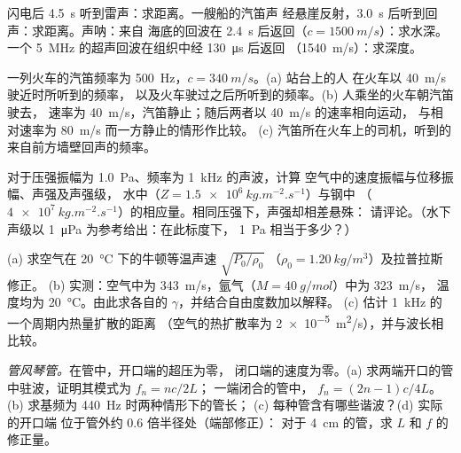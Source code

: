 \begin{exercise}[$\star$]\label{exo:b2:sound-waves:4}
闪电后 \qty{4.5}{s} 听到雷声：求距离。一艘船的汽笛声
经悬崖反射，\qty{3.0}{s} 后听到回声：求距离。声呐：来自
海底的回波在 \qty{2.4}{s} 后返回（$c = \qty{1500}{m/s}$）：求水深。一个
\qty{5}{MHz} 的超声回波在组织中经 \qty{130}{\micro s} 后返回
（\qty{1540}{m/s}）：求深度。
\end{exercise}

\begin{exercise}[$\star\star$]\label{exo:b2:sound-waves:5}
一列火车的汽笛频率为 \qty{500}{Hz}，$c = \qty{340}{m/s}$。(a) 站台上的人
在火车以 \qty{40}{m/s} 驶近时所听到的频率，
以及火车驶过之后所听到的频率。(b) 人乘坐的火车朝汽笛驶去，
速率为 \qty{40}{m/s}，汽笛静止；随后两者以 \qty{40}{m/s} 的速率相向运动，
与相对速率为 \qty{80}{m/s} 而一方静止的情形作比较。
(c) 汽笛所在火车上的司机，听到的
来自前方墙壁回声的频率。
\end{exercise}

\begin{exercise}[$\star\star$]\label{exo:b2:sound-waves:6}
对于压强振幅为 \qty{1.0}{Pa}、频率为 \qty{1}{kHz} 的声波，计算
空气中的速度振幅与位移振幅、声强及声强级，
水中（$Z = \qty{1.5e6}{kg.m^{-2}.s^{-1}}$）与钢中
（$\qty{4e7}{kg.m^{-2}.s^{-1}}$）的相应量。相同压强下，声强却相差悬殊：
请评论。（水下声级以 \qty{1}{\micro Pa} 为参考给出：在此标度下，
\qty{1}{Pa} 相当于多少？）
\end{exercise}

\begin{exercise}[$\star\star$]\label{exo:b2:sound-waves:7}
(a) 求空气在 \qty{20}{\degreeCelsius} 下的牛顿等温声速 $\sqrt{P_0/\rho_0}$
（$\rho_0 = \qty{1.20}{kg/m^3}$）及拉普拉斯修正。
(b) 实测：空气中为 \qty{343}{m/s}，氩气（$M = \qty{40}{g/mol}$）中为 \qty{323}{m/s}，
温度均为 \qty{20}{\degreeCelsius}。由此求各自的 $\gamma$，并结合自由度数加以解释。
(c) 估计 \qty{1}{kHz} 的一个周期内热量扩散的距离
（空气的热扩散率为
\qty{2e-5}{m^2/s}），并与波长相比较。
\end{exercise}

\begin{exercise}[$\star\star$]\label{exo:b2:sound-waves:8}
\emph{管风琴管。}在管中，开口端的超压为零，
闭口端的速度为零。(a) 求两端开口的管中驻波，证明其模式为 $f_n = nc/2L$；
一端闭合的管中，
$f_n = (2n - 1)c/4L$。(b) 求基频为 \qty{440}{Hz} 时两种情形下的管长；
(c) 每种管含有哪些谐波？(d) 实际的开口端
位于管外约 $0.6$ 倍半径处（端部修正）：
对于 \qty{4}{cm} 的管，求 $L$ 和 $f$ 的修正量。
\end{exercise}

